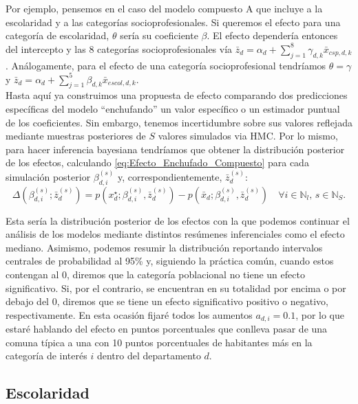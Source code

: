 Por ejemplo, pensemos en el caso del modelo compuesto A que incluye a la escolaridad y a las categorías socioprofesionales. Si queremos el efecto para una categoría de escolaridad, $\theta$ sería su coeficiente $\beta$. El efecto dependería entonces del intercepto y las 8 categorías socioprofesionales vía $\bar{z}_d = \alpha_d + \sum\limits_{j=1}^8 \gamma_{d,k}\bar{x}_{csp,d,k}$. Análogamente, para el efecto de una categoría socioprofesional tendríamos $\theta = \gamma$ y $\bar{z}_d = \alpha_d + \sum\limits_{j=1}^5 \beta_{d,k}\bar{x}_{escol,d,k}$.\\

Hasta aquí ya construimos una propuesta de efecto comparando dos predicciones específicas del modelo ``enchufando'' un valor específico o un estimador puntual de los coeficientes. Sin embargo, tenemos incertidumbre sobre sus valores reflejada mediante muestras posteriores de $S$ valores simulados via HMC. Por lo mismo, para hacer inferencia bayesiana tendríamos que obtener la distribución posterior de los efectos, calculando \eqref{eq:Efecto_Enchufado_Compuesto} para cada simulación posterior $\beta_{d,i}^{(s)}$ y, correspondientemente, $\bar{z}_d^{(s)}$:
\begin{equation*}
\Delta(\beta_{d,i}^{(s)};\bar{z}_d^{(s)}) =  p(x^\star_{d};\beta_{d,i}^{(s)},\bar{z}_d^{(s)})-p(\bar{x}_{d};\beta_{d,i}^{(s)},\bar{z}_d^{(s)}) \quad \forall i \in \mathbb{N}_l ,\, s \in \mathbb{N}_S.
\end{equation*}

Esta sería la distribución posterior de los efectos con la que podemos continuar el análisis de los modelos mediante distintos resúmenes inferenciales como el efecto mediano. Asimismo, podemos resumir la distribución reportando intervalos centrales de probabilidad al 95\% y, siguiendo la práctica común, cuando estos contengan al 0, diremos que la categoría poblacional no tiene un efecto significativo. Si, por el contrario, se encuentran en su totalidad por encima o por debajo del 0, diremos que se tiene un efecto significativo positivo o negativo, respectivamente. En esta ocasión fijaré todos los aumentos $a_{d,i}=0.1$, por lo que estaré hablando del efecto en puntos porcentuales que conlleva pasar de una comuna típica a una con 10 puntos porcentuales de habitantes más en la categoría de interés $i$ dentro del departamento $d$.

\subsection{Escolaridad}


